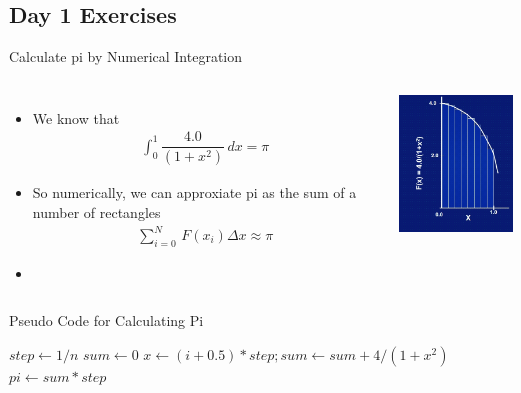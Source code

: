 \documentclass[10pt,t]{beamer}
\begin{document}
\subsection{Day 1 Exercises}
\begin{frame}[allowframebreaks]{Calculate pi by Numerical Integration}
  \begin{columns}
    \column{5cm}
    \begin{itemize}
      \item We know that
      \begin{align*}
        \int^1_0 \dfrac{4.0}{(1+x^2)}\, dx = \pi
      \end{align*}
      \item So numerically, we can approxiate pi as the sum of a number of rectangles
      \begin{align*}
        \sum^N_{i=0}\,F(x_i)\Delta x \approx \pi
      \end{align*}
      \item[] 
    \end{itemize}
    \column{5cm}
    \begin{center}
      \includegraphics[width=4cm]{./graphics/pi}
    \end{center}
  \end{columns}

  \begin{algorithm}[H]
    \caption{Pseudo Code for Calculating Pi}
    \begin{algorithmic}
        \State $step \gets 1/n$
        \State $sum \gets 0$
        \State $x \gets (i+0.5)*step; sum \gets sum + 4/(1+x^2)$
        \EndDo
        \State $pi \gets sum * step$
        \EndFunction
    \end{algorithmic}
  \end{algorithm}
\end{frame}
\end{document}
